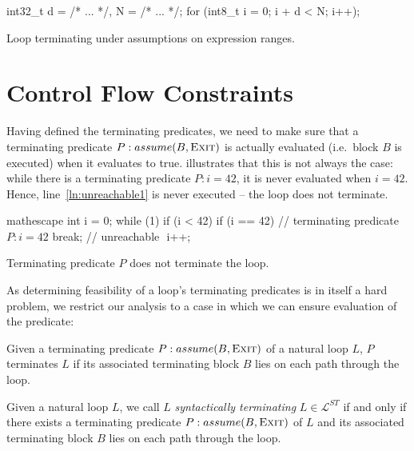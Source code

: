\begin{listing}[h]
\begin{ccode}
int32_t d = /* ... */,
        N = /* ... */;
for (int8_t i = 0; i + d < N; i++);
\end{ccode}
\caption{Loop terminating under assumptions on expression ranges.}
\label{lst:typerange}
\end{listing}

\section{Control Flow Constraints}
\label{sec:control_flow}

Having defined the terminating predicates, we need to make sure that a terminating predicate $P: assume(B, \textsc{Exit})$ is actually evaluated (i.e.\ block $B$ is executed) when it evaluates to true.  illustrates that this is not always the case: while there is a terminating predicate $P: i = 42$, it is never evaluated when $i = 42$. Hence, line~\ref{ln:unreachable1} is never executed – the loop does not terminate.

\begin{listing}[h]
\begin{ccode*}{mathescape}
int i = 0;
while (1) {
    if (i < 42) {
        if (i == 42) {  // terminating predicate $P: i = 42$
            break;      // unreachable $\label{ln:unreachable1}$
        }
    }
    i++;
}
\end{ccode*}
\caption{Terminating predicate $P$ does not terminate the loop.}
\label{lst:nonterm1}
\end{listing}

As determining feasibility of a loop's terminating predicates is in itself a hard problem, we restrict our analysis to a case in which we can ensure evaluation of the predicate:

\begin{theorem}
    Given a terminating predicate $P: assume(B, \textsc{Exit})$ of a natural loop $L$, $P$ terminates $L$ if its associated terminating block $B$ lies on each path through the loop.
    \label{thm:term}
\end{theorem}

\begin{definition}
    Given a natural loop $L$, we call $L$ \emph{syntactically terminating} $L \in \mathcal{L}^{ST}$ if and only if there exists a terminating predicate $P: assume(B, \textsc{Exit})$ of $L$ and its associated terminating block $B$ lies on each path through the loop.
\end{definition}

